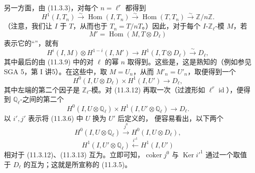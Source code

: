 另一方面，由 (11.3.3)，对每个 $n=\ell^r$ 都得到
\begin{equation}\tag{11.3.9}
 H^1(I,T_n)\xrightarrow{\sim}\operatorname{Hom}(I,T_n)
 \xrightarrow{\sim}\operatorname{Hom}(T,T_n)\xrightarrow{\sim}\mathbb Z/n\mathbb Z.
\end{equation}
（注意，我们让 $I$ 于 $T$，从而也于 $T_n=T/nT$。）因此，对于每个 $I$-$\mathbb Z_\ell$-模 $M$，若
\begin{equation}\tag{11.3.10}
 M'=\operatorname{Hom}(M,T\otimes D_\ell)
\end{equation}
表示它的“”，就有
\begin{equation}\tag{11.3.11}
 H^i(I,M)\otimes H^{1-i}(I,M')\longrightarrow H^1(I,T\otimes D_\ell)
 \xrightarrow{\sim}D_\ell,
\end{equation}
其中最后的由 (11.3.9) 中的对 $\ell$ 的幂 $n$ 取得到。这些是，这是熟知的（例如参见 SGA 5，第 I 讲5）。在这些中，取 $M=U_n$，从而 $M'_n=U'_n$，取便得到一个
\begin{equation}\tag{11.3.12}
 H^0(I,U\otimes D_\ell)\times H^1(I,U')\longrightarrow D_\ell,
\end{equation}
其中左端的第二个因子是 $\mathbb Z_\ell$-模。对 (11.3.12) 再取一次（过渡形如 $\ell^r\operatorname{id}$），便得到 $\mathbb Q_\ell$-之间的第二个
\begin{equation}\tag{11.3.13}
 H^0(I,U\otimes\mathbb Q_\ell)\times H^1(I,U'\otimes\mathbb Q_\ell)
 \longrightarrow D_\ell.
\end{equation}
以 $i',j'$ 表示将 (11.3.6) 中 $U$ 换为 $U'$ 后定义的，
便容易看出，以下两个
\[
 H^0(I,U\otimes\mathbb Q_\ell)\xrightarrow{j^0}H^0(I,U\otimes D_\ell),
\]
\[
 H^1(I,U'\otimes\mathbb Q_\ell)\xleftarrow{i'^1}H^1(I,U')
\]
相对于 (11.3.12)、(11.3.13) 互为。立即可知，$\operatorname{coker}j^0$ 与 $\operatorname{Ker}i'^1$ 通过一个取值于 $D_\ell$ 的互为；这就是所宣称的 (11.3.5)。

